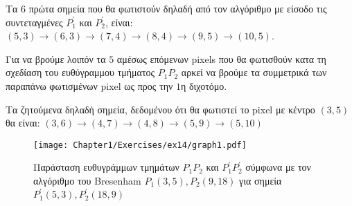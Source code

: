 \begin{solution}
Τα $6$ πρώτα σημεία που θα φωτιστούν δηλαδή από τον αλγόριθμο με είσοδο τις συντεταγμένες $P_1^{'}$ και $P_2^{'}$, είναι: \( (5,3) \to (6, 3) \to (7, 4) \to (8, 4) \to (9, 5) \to (10, 5) \).

Για να βρούμε λοιπόν τα $5$ αμέσως επόμενων pixels που θα φωτισθούν κατα τη σχεδίαση του ευθύγραμμου τμήματος $P_1 P_2$ αρκεί να βρούμε τα συμμετρικά των παραπάνω φωτισμένων pixel ως προς την $1$η διχοτόμο.

Τα ζητούμενα δηλαδή σημεία, δεδομένου ότι θα φωτιστεί το pixel με κέντρο $(3,5)$ θα είναι: \newline 
$(3, 6) \to (4, 7) \to (4, 8) \to (5, 9) \to (5, 10) $

\begin{figure}[hbt]
  \begin{center}
	\texttt{[image: Chapter1/Exercises/ex14/graph1.pdf]}
  \end{center}
  \caption{Παράσταση ευθυγράμμων τμημάτων $P_1 P_2$ και $P_1^{'} P_2^{'}$ σύμφωνα με τον αλγόριθμο του Bresenham $P_1(3, 5), P_2 (9, 18)$ για σημεία $P_1^{'}(5, 3), P_2^{'} (18, 9)$}
\end{figure}


\end{solution}